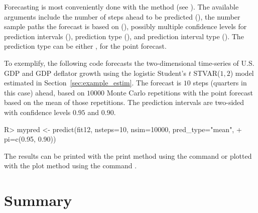 \documentclass[nojss]{jss}
\begin{document}
Forecasting is most conveniently done with the  method (see ). The available arguments include the number of steps ahead to be predicted (), the number sample paths the forecast is based on (), possibly multiple confidence levels for prediction intervals (), prediction type (), and prediction interval type (). The prediction type can be either ,  for the point forecast.

To exemplify, the following code forecasts the two-dimensional time-series of U.S. GDP and GDP deflator growth using the logistic Student's $t$ STVAR($1, 2$) model  estimated in Section~\ref{sec:example_estim}. The forecast is $10$ steps (quarters in this case) ahead, based on $10000$ Monte Carlo repetitions with the point forecast based on the mean of those repetitions. The prediction intervals are two-sided with confidence levels $0.95$ and $0.90$.
%
\begin{CodeChunk}
\begin{CodeInput}
R> mypred <- predict(fit12, nsteps=10, nsim=10000, pred_type="mean",
+    pi=c(0.95, 0.90))
\end{CodeInput}
\end{CodeChunk}
%
The results can be printed with the print method using the command  or plotted with the plot method using the command .


\section{Summary}\label{sec:summary}
\end{document}
